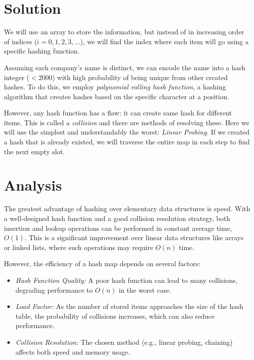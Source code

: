 \documentclass{article}
\begin{document}
\section{Solution}
\label{solution}

We will use an array to store the information, but instead of in increasing order of indices ($i=0, 1, 2, 3, ...$), we will find the index where each item will go using a specific hashing function.

Assuming each company's name is distinct, we can encode the name into a hash integer ($< 2000$) with high probability of being unique from other created hashes. To do this, we employ \emph{polynomial rolling hash function}, a hashing algorithm that creates hashes based on the specific character at a position.

However, any hash function has a flaw: it can create same hash for different items. This is called a \emph{collision} and there are methods of resolving these. Here we will use the simplest and understandably the worst: \emph{Linear Probing}. If we created a hash that is already existed, we will traverse the entire map in each step to find the next empty slot.

\section{Analysis}
\label{analysis}

The greatest advantage of hashing over elementary data structures is speed. With a well-designed hash function and a good collision resolution strategy, both insertion and lookup operations can be performed in constant average time, $O(1)$. This is a significant improvement over linear data structures like arrays or linked lists, where such operations may require $O(n)$ time.

However, the efficiency of a hash map depends on several factors:
\begin{itemize}
    \item \emph{Hash Function Quality:} A poor hash function can lead to many collisions, degrading performance to $O(n)$ in the worst case.
    \item \emph{Load Factor:} As the number of stored items approaches the size of the hash table, the probability of collisions increases, which can also reduce performance.
    \item \emph{Collision Resolution:} The chosen method (e.g., linear probing, chaining) affects both speed and memory usage.
\end{itemize}
\end{document}
